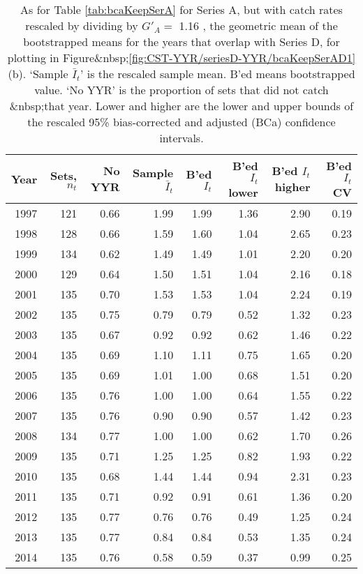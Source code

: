 \begin{table}[tp]
\centering
\caption{As for Table \ref{tab:bcaKeepSerA} for Series A, 
     but with catch rates rescaled by dividing
     by $G'_{A}=$ 1.16 , 
     the geometric mean of the bootstrapped means for the years that overlap
     with Series D, for plotting in 
     Figure&nbsp;\ref{fig:CST-YYR/seriesD-YYR/bcaKeepSerAD1}(b).
     `Sample $\bar{I}_t$' is the rescaled sample mean. B'ed means bootstrapped 
     value. `No YYR' is the proportion of sets that did not catch \spName&nbsp;that
     year. Lower and higher are the 
     lower and upper bounds of the rescaled 
     95\% bias-corrected and adjusted (BCa)
     confidence intervals.} 
\label{tab:serAscaled}
\begin{tabular}{rrrrrrrr}
  \hline
Year & Sets, $n_t$ & No YYR & Sample $\bar{I}_t$ & B'ed $I_t$ & B'ed $I_t$ lower & B'ed $I_t$ higher & B'ed $I_t$ CV \\ 
  \hline
1997 & 121 & 0.66 & 1.99 & 1.99 & 1.36 & 2.90 & 0.19 \\ 
  1998 & 128 & 0.66 & 1.59 & 1.60 & 1.04 & 2.65 & 0.23 \\ 
  1999 & 134 & 0.62 & 1.49 & 1.49 & 1.01 & 2.20 & 0.20 \\ 
  2000 & 129 & 0.64 & 1.50 & 1.51 & 1.04 & 2.16 & 0.18 \\ 
  2001 & 135 & 0.70 & 1.53 & 1.53 & 1.04 & 2.24 & 0.19 \\ 
  2002 & 135 & 0.75 & 0.79 & 0.79 & 0.52 & 1.32 & 0.23 \\ 
  2003 & 135 & 0.67 & 0.92 & 0.92 & 0.62 & 1.46 & 0.22 \\ 
  2004 & 135 & 0.69 & 1.10 & 1.11 & 0.75 & 1.65 & 0.20 \\ 
  2005 & 135 & 0.69 & 1.01 & 1.00 & 0.68 & 1.51 & 0.20 \\ 
  2006 & 135 & 0.76 & 1.00 & 1.00 & 0.64 & 1.55 & 0.22 \\ 
  2007 & 135 & 0.76 & 0.90 & 0.90 & 0.57 & 1.42 & 0.23 \\ 
  2008 & 134 & 0.77 & 1.00 & 1.00 & 0.62 & 1.70 & 0.26 \\ 
  2009 & 135 & 0.71 & 1.25 & 1.25 & 0.82 & 1.93 & 0.22 \\ 
  2010 & 135 & 0.68 & 1.44 & 1.44 & 0.94 & 2.31 & 0.23 \\ 
  2011 & 135 & 0.71 & 0.92 & 0.91 & 0.61 & 1.36 & 0.20 \\ 
  2012 & 135 & 0.77 & 0.76 & 0.76 & 0.49 & 1.25 & 0.24 \\ 
  2013 & 135 & 0.77 & 0.84 & 0.84 & 0.53 & 1.35 & 0.24 \\ 
  2014 & 135 & 0.76 & 0.58 & 0.59 & 0.37 & 0.99 & 0.25 \\ 
   \hline
\end{tabular}
\end{table}%
